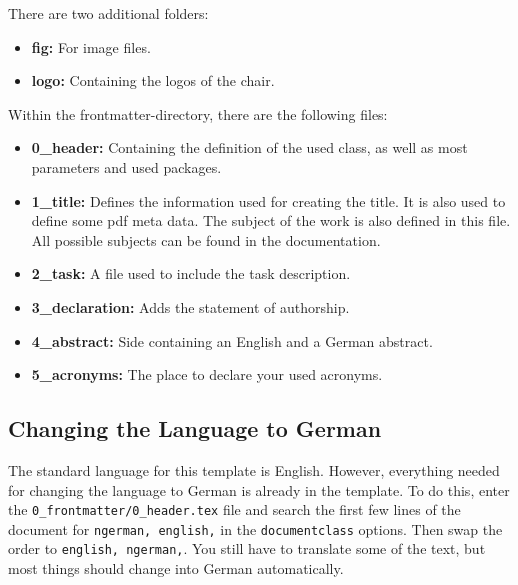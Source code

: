 There are two additional folders:
\vspace{-\topsep}
\begin{itemize}
	\item \textbf{fig:} For image files.
	\item \textbf{logo:} Containing the logos of the chair.
\end{itemize}

Within the frontmatter-directory, there are the following files:
\vspace{-\topsep}
\begin{itemize}
	\item \textbf{0\_header:} Containing the definition of the used class, as well as most parameters and used packages.
	\item \textbf{1\_title:} Defines the information used for creating the title. It is also used to define some pdf meta data. The subject of the work is also defined in this file. All possible subjects can be found in the documentation.
	\item \textbf{2\_task:} A file used to include the task description.
	\item \textbf{3\_declaration:} Adds the statement of authorship.
	\item \textbf{4\_abstract:} Side containing an English and a German abstract.
	\item \textbf{5\_acronyms:} The place to declare your used acronyms.
\end{itemize}


\subsection{Changing the Language to German}
The standard language for this template is English. However, everything needed for changing the language to German is already in the template. To do this, enter the \texttt{0\_frontmatter/0\_header.tex} file and search the first few lines of the document for \texttt{ngerman, english,} in the \texttt{documentclass} options. Then swap the order to \texttt{english, ngerman,}. You still have to translate some of the text, but most things should change into German automatically.


